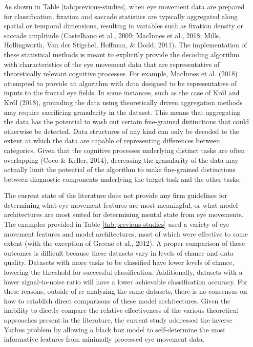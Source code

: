 \documentclass[
  english,
  man,floatsintext]{apa6}
\begin{document}
As shown in Table \ref{tab:previous-studies}, when eye movement data are prepared for classification, fixation and saccade statistics are typically aggregated along spatial or temporal dimensions, resulting in variables such as fixation density or saccade amplitude (Castelhano et al., 2009; MacInnes et al., 2018; Mills, Hollingworth, Van der Stigchel, Hoffman, \& Dodd, 2011). The implementation of these statistical methods is meant to explicitly provide the decoding algorithm with characteristics of the eye movement data that are representative of theoretically relevant cognitive processes. For example, MacInnes et al. (2018) attempted to provide an algorithm with data designed to be representative of inputs to the frontal eye fields. In some instances, such as the case of Król and Król (2018), grounding the data using theoretically driven aggregation methods may require sacrificing granularity in the dataset. This means that aggregating the data has the potential to wash out certain fine-grained distinctions that could otherwise be detected. Data structures of any kind can only be decoded to the extent at which the data are capable of representing differences between categories. Given that the cognitive processes underlying distinct tasks are often overlapping (Coco \& Keller, 2014), decreasing the granularity of the data may actually limit the potential of the algorithm to make fine-grained distinctions between diagnostic components underlying the target task and the other tasks.

The current state of the literature does not provide any firm guidelines for determining what eye movement features are most meaningful, or what model architectures are most suited for determining mental state from eye movements. The examples provided in Table \ref{tab:previous-studies} used a variety of eye movement features and model architectures, most of which were effective to some extent (with the exception of Greene et al., 2012). A proper comparison of these outcomes is difficult because these datasets vary in levels of chance and data quality. Datasets with more tasks to be classified have lower levels of chance, lowering the threshold for successful classification. Additionally, datasets with a lower signal-to-noise ratio will have a lower achievable classification accuracy. For these reasons, outside of re-analyzing the same datasets, there is no consensus on how to establish direct comparisons of these model architectures. Given the inability to diectly compare the relative effectiveness of the various theoretical approaches present in the literature, the current study addressed the inverse Yarbus problem by allowing a black box model to self-determine the most informative features from minimally processed eye movement data.
\end{document}
